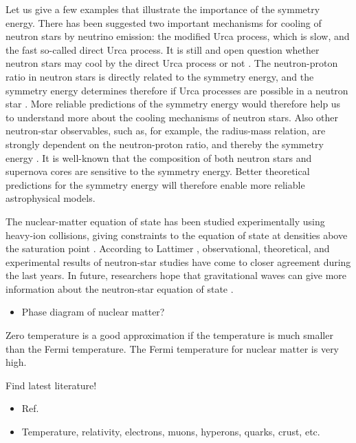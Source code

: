 \documentclass[a4paper,12pt]{report}
\begin{document}
Let us give a few examples that illustrate the importance
of the symmetry energy. There has been suggested two 
important mechanisms for cooling of 
neutron stars by neutrino emission: the modified Urca 
process, which is slow, and the fast so-called direct Urca 
process. It is still and open question whether neutron stars 
may cool by the direct Urca 
process or not \cite{lattimer2004}. The neutron-proton ratio
in neutron stars is directly related to the symmetry energy,
and the symmetry energy determines therefore if Urca processes 
are possible in a neutron star \cite{heiselberg,lattimer2004}. 
More reliable predictions of the symmetry energy would therefore 
help us to understand more about the cooling mechanisms of 
neutron stars. Also other neutron-star observables, such as,
for example, the radius-mass relation, are strongly dependent
on the neutron-proton ratio, and thereby the symmetry energy 
\cite{lattimer2000}. It is well-known that the composition of 
both neutron stars \cite{lattimer2004} and supernova cores 
\cite{botvina_2004} are sensitive to the symmetry energy. 
Better theoretical predictions for the symmetry energy will 
therefore enable more reliable astrophysical models.

The nuclear-matter equation of state has been studied 
experimentally using heavy-ion collisions, giving 
constraints to the equation of state at densities above 
the saturation point \cite{danielewicz2002,lynch2009}. 
According to Lattimer \cite{lattimer2012}, observational,
theoretical, and experimental results of neutron-star studies
have come to closer agreement during the last years.
In future, researchers hope that gravitational waves can 
give more information about the neutron-star equation of 
state \cite{maselli_2013}.


\vspace{1cm}


\begin{itemize}
\item Phase diagram of nuclear matter?   
\end{itemize}

Zero temperature is a good approximation if the temperature is 
much smaller than the Fermi temperature. The Fermi temperature 
for nuclear matter is very high.

\vspace{1cm}
Find latest literature!
\begin{itemize}
\item Ref. \cite{tews,erler_pre}
\item Temperature, relativity, electrons, muons, hyperons, 
  quarks, crust, etc.
\end{itemize}
\end{document}
